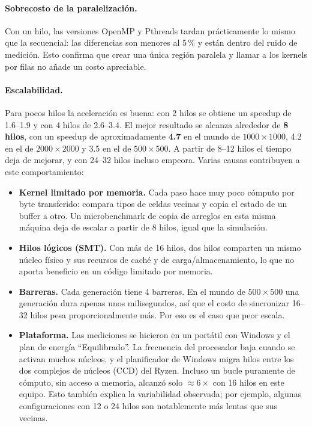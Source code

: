 
\paragraph{Sobrecosto de la paralelización.} Con un hilo, las versiones OpenMP y Pthreads tardan
prácticamente lo mismo que la secuencial: las diferencias son menores al 5\,\% y están dentro del ruido de
medición. Esto confirma que crear una única región paralela y llamar a los kernels por filas no añade un
costo apreciable.

\paragraph{Escalabilidad.} Para pocos hilos la aceleración es buena: con 2 hilos se obtiene un speedup de
1.6--1.9 y con 4 hilos de 2.6--3.4. El mejor resultado se alcanza alrededor de \textbf{8 hilos}, con un
speedup de aproximadamente \textbf{4.7} en el mundo de $1000\times1000$, 4.2 en el de $2000\times2000$ y 3.5
en el de $500\times500$. A partir de 8--12 hilos el tiempo deja de mejorar, y con 24--32 hilos incluso
empeora. Varias causas contribuyen a este comportamiento:
\begin{itemize}[nosep]
  \item \textbf{Kernel limitado por memoria.} Cada paso hace muy poco cómputo por byte transferido:
    compara tipos de celdas vecinas y copia el estado de un buffer a otro. Un microbenchmark de copia de
    arreglos en esta misma máquina deja de escalar a partir de 8 hilos, igual que la simulación.
  \item \textbf{Hilos lógicos (SMT).} Con más de 16 hilos, dos hilos comparten un mismo núcleo físico y sus
    recursos de caché y de carga/almacenamiento, lo que no aporta beneficio en un código limitado por memoria.
  \item \textbf{Barreras.} Cada generación tiene 4 barreras. En el mundo de $500\times500$ una generación
    dura apenas unos milisegundos, así que el costo de sincronizar 16--32 hilos pesa proporcionalmente más.
    Por eso es el caso que peor escala.
  \item \textbf{Plataforma.} Las mediciones se hicieron en un portátil con Windows y el plan de energía
    ``Equilibrado''. La frecuencia del procesador baja cuando se activan muchos núcleos, y el planificador de
    Windows migra hilos entre los dos complejos de núcleos (CCD) del Ryzen. Incluso un bucle puramente de
    cómputo, sin acceso a memoria, alcanzó solo $\approx6\times$ con 16 hilos en este equipo. Esto también
    explica la variabilidad observada; por ejemplo, algunas configuraciones con 12 o 24 hilos son
    notablemente más lentas que sus vecinas.
\end{itemize}

